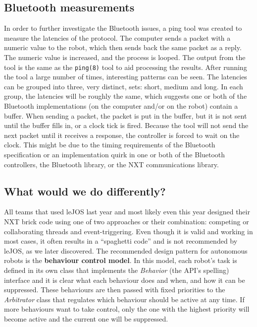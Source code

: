 \subsection{Bluetooth measurements}
In order to further investigate the Bluetooth issues, a ping tool was created to measure 
the latencies of the protocol. The computer sends a packet with a numeric value to the 
robot, which then sends back the same packet as a reply. The numeric value is increased, 
and the process is looped. The output from the tool is the same as the \texttt{ping(8)} 
tool to aid processing the results. After running the tool a large number of times, 
interesting patterns can be seen. The latencies can be grouped into three, very distinct, 
sets: short, medium and long. In each group, the latencies will be roughly the same, 
which suggests one or both of the Bluetooth implementations (on the computer and/or on 
the robot) contain a buffer. When sending a packet, the packet is put in the buffer, but 
it is not sent until the buffer fills in, or a clock tick is fired. Because the tool will 
not send the next packet until it receives a response, the controller is forced to wait 
on the clock. This might be due to the timing requirements of the Bluetooth specification 
or an implementation quirk in one or both of the Bluetooth controllers, the Bluetooth 
library, or the NXT communications library.

\subsection{What would we do differently?}
All teams that used leJOS last year and most likely even this year designed their NXT brick 
code using one of two approaches or their combination: competing or collaborating threads 
and event-triggering. Even though it is valid and working in most cases, it often results in 
a ``spaghetti code'' and is not recommended by leJOS, as we later discovered. The 
recommended design pattern for autonomous robots is the 
\textbf{behaviour control model}\cite{behaviour}. In this model, each robot's task is defined 
in its own class that implements the \textsl{Behavior} (the API's spelling) interface and it 
is clear what each behaviour does and when, and how it can be suppressed. These behaviours are 
then passed with fixed priorities to the \textsl{Arbitrator} class that regulates which 
behaviour should be active at any time. If more behaviours want to take control, only the one 
with the highest priority will become active and the current one will be suppressed.

